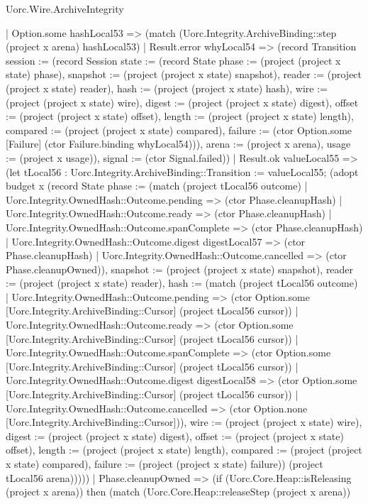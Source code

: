 \begin{lexlean}{Uorc.Wire.ArchiveIntegrity}
\begin{semanticmodule}
{      | Option.some hashLocal53 => (match (Uorc.Integrity.ArchiveBinding::step (project x arena) hashLocal53)
        | Result.error whyLocal54 => (record Transition {session := (record Session {state := (record State {phase := (project (project x state) phase), snapshot := (project (project x state) snapshot), reader := (project (project x state) reader), hash := (project (project x state) hash), wire := (project (project x state) wire), digest := (project (project x state) digest), offset := (project (project x state) offset), length := (project (project x state) length), compared := (project (project x state) compared), failure := (ctor Option.some [Failure] (ctor Failure.binding whyLocal54))}), arena := (project x arena), usage := (project x usage)}), signal := (ctor Signal.failed)})
        | Result.ok valueLocal55 => (let tLocal56 : Uorc.Integrity.ArchiveBinding::Transition := valueLocal55; (adopt budget x (record State {phase := (match (project tLocal56 outcome)
          | Uorc.Integrity.OwnedHash::Outcome.pending => (ctor Phase.cleanupHash)
          | Uorc.Integrity.OwnedHash::Outcome.ready => (ctor Phase.cleanupHash)
          | Uorc.Integrity.OwnedHash::Outcome.spanComplete => (ctor Phase.cleanupHash)
          | Uorc.Integrity.OwnedHash::Outcome.digest digestLocal57 => (ctor Phase.cleanupHash)
          | Uorc.Integrity.OwnedHash::Outcome.cancelled => (ctor Phase.cleanupOwned)), snapshot := (project (project x state) snapshot), reader := (project (project x state) reader), hash := (match (project tLocal56 outcome)
          | Uorc.Integrity.OwnedHash::Outcome.pending => (ctor Option.some [Uorc.Integrity.ArchiveBinding::Cursor] (project tLocal56 cursor))
          | Uorc.Integrity.OwnedHash::Outcome.ready => (ctor Option.some [Uorc.Integrity.ArchiveBinding::Cursor] (project tLocal56 cursor))
          | Uorc.Integrity.OwnedHash::Outcome.spanComplete => (ctor Option.some [Uorc.Integrity.ArchiveBinding::Cursor] (project tLocal56 cursor))
          | Uorc.Integrity.OwnedHash::Outcome.digest digestLocal58 => (ctor Option.some [Uorc.Integrity.ArchiveBinding::Cursor] (project tLocal56 cursor))
          | Uorc.Integrity.OwnedHash::Outcome.cancelled => (ctor Option.none [Uorc.Integrity.ArchiveBinding::Cursor])), wire := (project (project x state) wire), digest := (project (project x state) digest), offset := (project (project x state) offset), length := (project (project x state) length), compared := (project (project x state) compared), failure := (project (project x state) failure)}) (project tLocal56 arena)))))
    | Phase.cleanupOwned => (if (Uorc.Core.Heap::isReleasing (project x arena)) then (match (Uorc.Core.Heap::releaseStep (project x arena))
}
\end{semanticmodule}
\end{lexlean}
